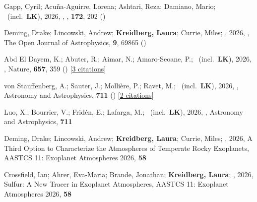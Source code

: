 \item[{\color{numcolor}\scriptsize166}] Gapp, Cyril; Acu{\~n}a-Aguirre, Lorena; Ashtari, Reza; Damiano, Mario; \etal\ (incl.\ \textbf{LK}), 2026, , \aj, \textbf{172}, 202 ()

\item[{\color{numcolor}\scriptsize165}] Deming, Drake; Lincowski, Andrew; \textbf{Kreidberg, Laura}; Currie, Miles; \etal, 2026, , The Open Journal of Astrophysics, \textbf{9}, 69865 ()

\item[{\color{numcolor}\scriptsize164}] Abd El Dayem, K.; Abuter, R.; Aimar, N.; Amaro-Seoane, P.; \etal\ (incl.\ \textbf{LK}), 2026, , Nature, \textbf{657}, 359 () [\href{https://ui.adsabs.harvard.edu/abs/2026Natur.657..359A}{3 citations}]

\item[{\color{numcolor}\scriptsize163}] von Stauffenberg, A.; Sauter, J.; Molli{\`e}re, P.; Ravet, M.; \etal\ (incl.\ \textbf{LK}), 2026, , Astronomy and Astrophysics, \textbf{711} () [\href{https://ui.adsabs.harvard.edu/abs/2026A&A...711L...2V}{2 citations}]

\item[{\color{numcolor}\scriptsize162}] Luo, X.; Bourrier, V.; Frid{\'e}n, E.; Lafarga, M.; \etal\ (incl.\ \textbf{LK}), 2026, , Astronomy and Astrophysics, \textbf{711}

\item[{\color{numcolor}\scriptsize161}] Deming, Drake; Lincowski, Andrew; \textbf{Kreidberg, Laura}; Currie, Miles; \etal, 2026, A Third Option to Characterize the Atmospheres of Temperate Rocky Exoplanets, AASTCS 11: Exoplanet Atmospheres 2026, \textbf{58}

\item[{\color{numcolor}\scriptsize160}] Crossfield, Ian; Ahrer, Eva-Maria; Brande, Jonathan; \textbf{Kreidberg, Laura}; \etal, 2026, Sulfur: A New Tracer in Exoplanet Atmospheres, AASTCS 11: Exoplanet Atmospheres 2026, \textbf{58}

